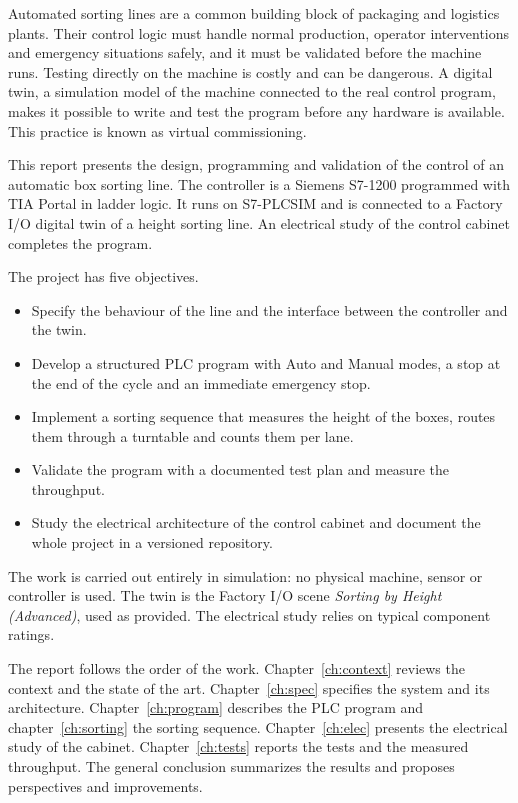\documentclass[11pt,a4paper]{report}
\begin{document}
Automated sorting lines are a common building block of packaging and logistics plants. Their control logic must handle normal production, operator interventions and emergency situations safely, and it must be validated before the machine runs. Testing directly on the machine is costly and can be dangerous. A digital twin, a simulation model of the machine connected to the real control program, makes it possible to write and test the program before any hardware is available. This practice is known as virtual commissioning.

This report presents the design, programming and validation of the control of an automatic box sorting line. The controller is a Siemens S7-1200 programmed with TIA Portal in ladder logic. It runs on S7-PLCSIM and is connected to a Factory I/O digital twin of a height sorting line. An electrical study of the control cabinet completes the program.

The project has five objectives.
\begin{itemize}
  \item Specify the behaviour of the line and the interface between the controller and the twin.
  \item Develop a structured PLC program with Auto and Manual modes, a stop at the end of the cycle and an immediate emergency stop.
  \item Implement a sorting sequence that measures the height of the boxes, routes them through a turntable and counts them per lane.
  \item Validate the program with a documented test plan and measure the throughput.
  \item Study the electrical architecture of the control cabinet and document the whole project in a versioned repository.
\end{itemize}

The work is carried out entirely in simulation: no physical machine, sensor or controller is used. The twin is the Factory I/O scene \emph{Sorting by Height (Advanced)}, used as provided. The electrical study relies on typical component ratings.

The report follows the order of the work. Chapter~\ref{ch:context} reviews the context and the state of the art. Chapter~\ref{ch:spec} specifies the system and its architecture. Chapter~\ref{ch:program} describes the PLC program and chapter~\ref{ch:sorting} the sorting sequence. Chapter~\ref{ch:elec} presents the electrical study of the cabinet. Chapter~\ref{ch:tests} reports the tests and the measured throughput. The general conclusion summarizes the results and proposes perspectives and improvements.
\end{document}

